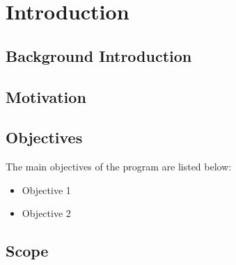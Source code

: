\documentclass[a4paper, 12pt]{report}
\title{\projectTitle}
\author{Niyoj Oli}
\date{\projectDate}
\begin{document}





\pagestyle{plain} %







\tableofcontents
\newpage

\listoffigures
\newpage

\listoftables
\newpage

\printglossary[type=acronym,style=acronyms]
\newpage

\pagestyle{fancy}    %

\chapter{Introduction}
\lipsum[10]

\section{Background Introduction}
\lipsum[15]

\section{Motivation}
\lipsum[5]

\lipsum[10]\cite{einstein}

\section{Objectives}
The main objectives of the program are listed below:
\begin{itemize}
    \item Objective 1
    \item Objective 2
\end{itemize}

\section{Scope}
\lipsum[5]
\end{document}
